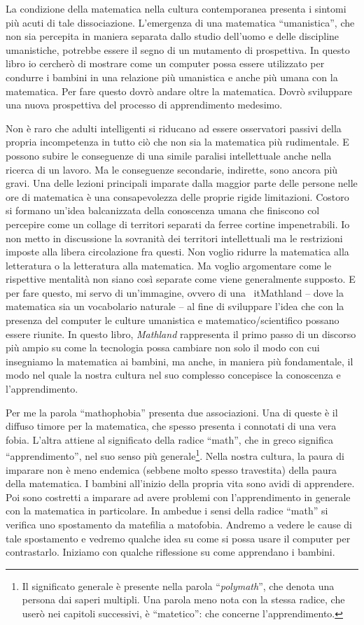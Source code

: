 La condizione della matematica nella cultura contemporanea presenta i sintomi più acuti di tale dissociazione. L'emergenza di una matematica “umanistica”, che non sia percepita in maniera separata dallo studio dell'uomo e delle discipline umanistiche, potrebbe essere il segno di un mutamento di prospettiva. In questo libro io cercherò di mostrare come un computer possa essere utilizzato per condurre i bambini in una relazione più umanistica e anche più umana con la matematica. Per fare questo dovrò andare oltre la matematica. Dovrò sviluppare una nuova prospettiva del processo di apprendimento medesimo.

Non è raro che adulti intelligenti si riducano ad essere osservatori passivi della propria incompetenza in tutto ciò che non sia la matematica più rudimentale. E possono subire le conseguenze di una simile paralisi intellettuale anche nella ricerca di un lavoro. Ma le conseguenze secondarie, indirette, sono ancora più gravi. Una delle lezioni principali imparate dalla maggior parte delle persone nelle ore di matematica è una consapevolezza delle proprie rigide limitazioni. Costoro si formano un'idea balcanizzata della conoscenza umana che finiscono col percepire come un collage di territori separati da ferree cortine impenetrabili. Io non metto in discussione la sovranità dei territori intellettuali ma le restrizioni imposte alla libera circolazione fra questi. Non voglio ridurre la matematica alla letteratura o la letteratura alla matematica. Ma voglio argomentare come le rispettive mentalità non siano così separate come viene generalmente supposto. E per fare questo, mi servo di un'immagine, ovvero di una \
it{Mathland}  – dove la matematica sia un vocabolario naturale – al fine di sviluppare l'idea che con la presenza del computer le culture umanistica e matematico/scientifico possano essere riunite. In questo libro, \textit{Mathland} rappresenta il primo passo di un discorso più ampio su come la tecnologia possa cambiare non solo il modo con cui insegniamo la matematica ai bambini, ma anche, in maniera più fondamentale, il modo nel quale la nostra cultura nel suo complesso concepisce la conoscenza e l'apprendimento.

Per me la parola “mathophobia” presenta due associazioni. Una di queste è il diffuso timore per la matematica, che spesso presenta i connotati di una vera fobia. L'altra attiene al significato della radice “math”, che in greco significa “apprendimento”, nel suo senso più generale\footnote{Il significato generale è presente nella parola “\textit{polymath}”, che denota una persona dai saperi multipli. Una parola meno nota con la stessa radice, che userò nei capitoli successivi, è “matetico”: che concerne l'apprendimento.}.  Nella nostra cultura, la paura di imparare non è meno endemica (sebbene molto spesso travestita) della paura della matematica. I bambini all'inizio della propria vita sono avidi di apprendere. Poi sono costretti a imparare ad avere problemi con l'apprendimento in generale con la matematica in particolare. In ambedue i sensi della radice “math” si verifica uno spostamento da matefilia a matofobia. Andremo a vedere le cause di tale spostamento e vedremo qualche idea su come si possa usare il computer per contrastarlo. Iniziamo con qualche riflessione su come apprendano i bambini.

